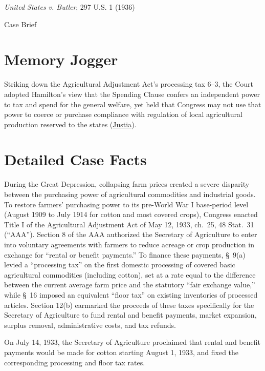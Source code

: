 \documentclass[12pt]{article}
\begin{document}
\begin{center}
{\LARGE \textit{United States v. Butler}, 297 U.S. 1 (1936)\par}
\vspace{0.8em}
{\large Case Brief\par}
\end{center}
\vspace{1em}

\section{Memory Jogger}
Striking down the Agricultural Adjustment Act's processing tax 6--3, the Court adopted Hamilton's view that the Spending Clause confers an independent power to tax and spend for the general welfare, yet held that Congress may not use that power to coerce or purchase compliance with regulation of local agricultural production reserved to the states (\href{https://supreme.justia.com/cases/federal/us/297/1/}{Justia}).

\section{Detailed Case Facts}
During the Great Depression, collapsing farm prices created a severe disparity between the purchasing power of agricultural commodities and industrial goods. To restore farmers' purchasing power to its pre-World War I base-period level (August 1909 to July 1914 for cotton and most covered crops), Congress enacted Title I of the Agricultural Adjustment Act of May 12, 1933, ch.\ 25, 48 Stat.\ 31 (``AAA''). Section 8 of the AAA authorized the Secretary of Agriculture to enter into voluntary agreements with farmers to reduce acreage or crop production in exchange for ``rental or benefit payments.'' To finance these payments, \S\ 9(a) levied a ``processing tax'' on the first domestic processing of covered basic agricultural commodities (including cotton), set at a rate equal to the difference between the current average farm price and the statutory ``fair exchange value,'' while \S\ 16 imposed an equivalent ``floor tax'' on existing inventories of processed articles. Section 12(b) earmarked the proceeds of these taxes specifically for the Secretary of Agriculture to fund rental and benefit payments, market expansion, surplus removal, administrative costs, and tax refunds.

On July 14, 1933, the Secretary of Agriculture proclaimed that rental and benefit payments would be made for cotton starting August 1, 1933, and fixed the corresponding processing and floor tax rates.
\end{document}
